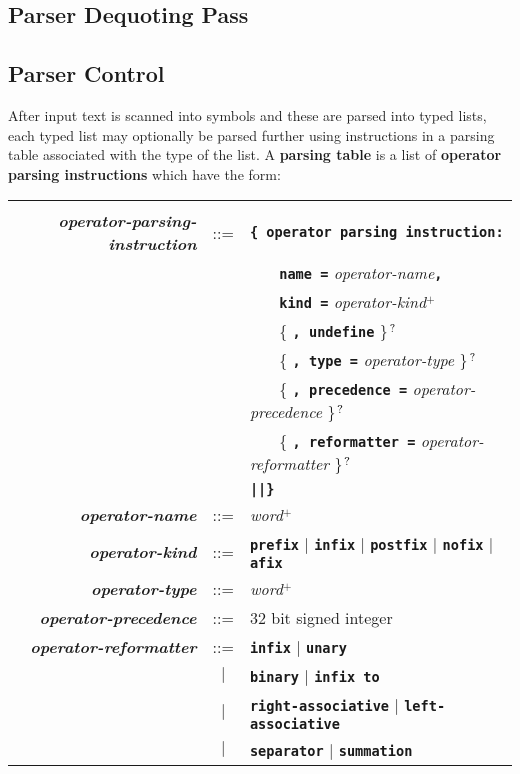 \documentclass[12pt]{article}
\newcommand{\TT}[1]{{\tt \bfseries #1}}
\newcommand{\key}[1]{{\rm \bfseries #1}}
\newcommand{\emkey}[1]{{\em \bfseries #1}}
\newcommand{\PLUS}[1][]{{$^{+#1}$}}
\newcommand{\QMARK}{{$^{\,\mbox{\footnotesize ?}}$}}
\begin{document}
\subsection{Parser Dequoting Pass}
\label{PARSER-DEQUOTING-PASS}

\subsection{Parser Control}
\label{PARSER-CONTROL}

After input text is scanned into symbols and these are parsed into
typed lists, each typed list may optionally be parsed further using
instructions in a parsing table associated with the type of the list.
A \key{parsing table} is a list
of \key{operator parsing instructions}
which have the form:

\begin{tabular}{rcl}
\hspace*{1.7in} \\[-2ex]
\emkey{operator-parsing-instruction}
    & ::= & \TT{\{ operator parsing instruction:} \\
    &     & ~~~ \TT{name =} {\em operator-name}\TT{,} \\
    &     & ~~~ \TT{kind =} {\em operator-kind}\PLUS{} \\
    &     & ~~~ \{ \TT{, undefine} \}\QMARK{} \\
    &     & ~~~ \{ \TT{, type =}
                   {\em operator-type} \}\QMARK{} \\
    &     & ~~~ \{ \TT{, precedence =}
                   {\em operator-precedence} \}\QMARK{} \\
    &     & ~~~ \{ \TT{, reformatter =}
                   {\em operator-reformatter} \}\QMARK{} \\
    &     & \TT{||\}} \\
\emkey{operator-name}
    & ::= & {\em word}\PLUS{} \\
\emkey{operator-kind}
    & ::= & \TT{prefix} $|$ \TT{infix} $|$ \TT{postfix} $|$
            \TT{nofix} $|$ \TT{afix} \\
\emkey{operator-type}
    & ::= & {\em word}\PLUS{} \\
\emkey{operator-precedence}
    & ::= & 32 bit signed integer \\
\emkey{operator-reformatter}
    & ::= & \TT{infix} $|$ \TT{unary} \\
    & $|$ & \TT{binary} $|$ \TT{infix to} \\
    & $|$ & \TT{right-associative} $|$ \TT{left-associative} \\
    & $|$ & \TT{separator} $|$ \TT{summation} \\
\end{tabular}
\end{document}
